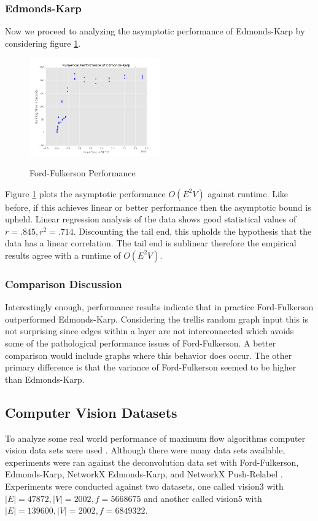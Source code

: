 \documentclass{article}
\begin{document}
\subsubsection{Edmonds-Karp}
Now we proceed to analyzing the asymptotic performance of Edmonds-Karp by considering figure \ref{ek-performance}.

\begin{figure}[!ht]
	\caption{Ford-Fulkerson Performance}
	\centering
	\includegraphics[width=0.5\textwidth]{images/ek-performance.png}
	\label{ek-performance}
\end{figure}

Figure \ref{ek-performance} plots the asymptotic performance $O(E^2V)$ against runtime. Like before, if this achieves linear or better performance then the asymptotic bound is upheld. Linear regression analysis of the data shows good statistical values of $r=.845,r^2=.714$. Discounting the tail end, this upholds the hypothesis that the data has a linear correlation. The tail end is sublinear therefore the empirical results agree with a runtime of $O(E^2V)$.

\subsubsection{Comparison Discussion}
Interestingly enough, performance results indicate that in practice Ford-Fulkerson outperformed Edmonds-Karp. Considering the trellis random graph input this is not surprising since edges within a layer are not interconnected which avoids some of the pathological performance issues of Ford-Fulkerson. A better comparison would include graphs where this behavior does occur. The other primary difference is that the variance of Ford-Fulkerson seemed to be higher than Edmonds-Karp.

\subsection{Computer Vision Datasets}
To analyze some real world performance of maximum flow algorithms computer vision data sets were used \cite{Verma:2012gs}. Although there were many data sets available, experiments were ran against the deconvolution data set with Ford-Fulkerson, Edmonds-Karp, NetworkX Edmonds-Karp, and NetworkX Push-Relabel \cite{networkx}. Experiments were conducted against two datasets, one called vision3 with $|E|=47872,|V|=2002,f=5668675$ and another called vision5 with $|E|=139600,|V|=2002,f=6849322$.
\end{document}
